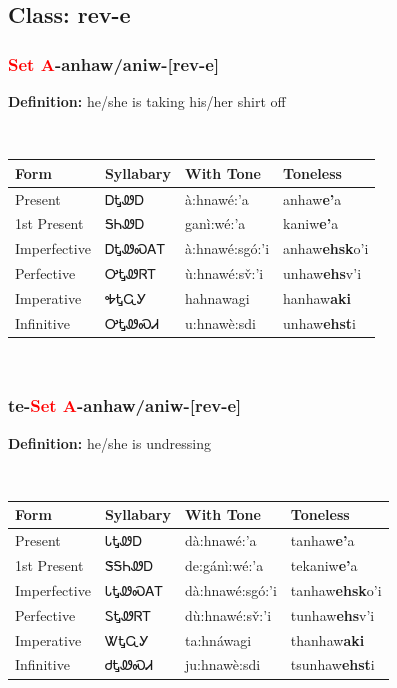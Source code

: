 \subsection*{Class: rev-e}
\nopagebreak
\needspace{2in}
\subsubsection*{\textcolor{Red}{Set A}{-}\textbf{anhaw/aniw}{-}[rev-e]}
\nopagebreak
\textbf{Definition: } he/she is taking his/her shirt off
\\[0.5em]
\begin{tabularx}{\textwidth}{l X X X}%
\toprule%
\textbf{Form}&\textbf{Syllabary}&\textbf{With Tone}&\textbf{Toneless}\\%
\midrule%
Present&ᎠᎿᏪᎠ&à:hnawé:’a&anhaw\textbf{e'}a\\%
1st Present&ᎦᏂᏪᎠ&ganì:wé:’a&kaniw\textbf{e'}a\\%
Imperfective&ᎠᎿᏪᏍᎪᎢ&à:hnawé:sgó:’i&anhaw\textbf{ehsk}o'i\\%
Perfective&ᎤᎿᏪᏒᎢ&ù:hnawé:sv̌:’i&unhaw\textbf{ehs}v'i\\%
Imperative&ᎭᎿᏩᎩ&hahnawagi&hanhaw\textbf{aki}\\%
Infinitive&ᎤᎿᏪᏍᏗ&u:hnawè:sdi&unhaw\textbf{ehst}i\\%
\bottomrule%
\end{tabularx}
\\[1em]
\needspace{2in}
\subsubsection*{te{-}\textcolor{Red}{Set A}{-}\textbf{anhaw/aniw}{-}[rev-e]}
\nopagebreak
\textbf{Definition: } he/she is undressing
\\[0.5em]
\begin{tabularx}{\textwidth}{l X X X}%
\toprule%
\textbf{Form}&\textbf{Syllabary}&\textbf{With Tone}&\textbf{Toneless}\\%
\midrule%
Present&ᏓᎿᏪᎠ&dà:hnawé:’a&tanhaw\textbf{e'}a\\%
1st Present&ᏕᎦᏂᏪᎠ&de:gánì:wé:’a&tekaniw\textbf{e'}a\\%
Imperfective&ᏓᎿᏪᏍᎪᎢ&dà:hnawé:sgó:’i&tanhaw\textbf{ehsk}o'i\\%
Perfective&ᏚᎿᏪᏒᎢ&dù:hnawé:sv̌:’i&tunhaw\textbf{ehs}v'i\\%
Imperative&ᏔᎿᏩᎩ&ta:hnáwagi&thanhaw\textbf{aki}\\%
Infinitive&ᏧᎿᏪᏍᏗ&ju:hnawè:sdi&tsunhaw\textbf{ehst}i\\%
\bottomrule%
\end{tabularx}
\\[1em]
\needspace{3in}

